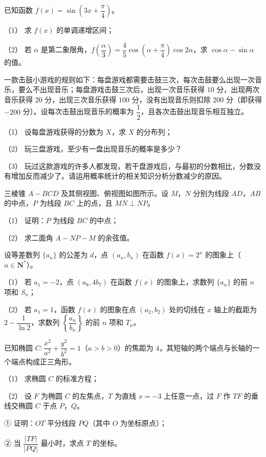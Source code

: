 \begin{question}
已知函数 $f(x)=\sin\left(3x+\dfrac\pi4\right)$。

（1） 求 $f(x)$ 的单调递增区间；

（2） 若 $\alpha$ 是第二象限角，$f\left(\dfrac\alpha3\right)=\dfrac45\cos\left(\alpha+\dfrac\pi4\right)\cos 2\alpha$，求 $\cos\alpha-\sin\alpha$ 的值。

\end{question}
\begin{question}
一款击鼓小游戏的规则如下：每盘游戏都需要击鼓三次，每次击鼓要么出现一次音乐，要么不出现音乐；每盘游戏击鼓三次后，出现一次音乐获得 $10$ 分，出现两次音乐获得 $20$ 分，出现三次音乐获得 $100$ 分，没有出现音乐则扣除 $200$ 分（即获得 $-200$ 分）。设每次击鼓出现音乐的概率为 $\dfrac12$，且各次击鼓出现音乐相互独立。

（1） 设每盘游戏获得的分数为 $X$，求 $X$ 的分布列；

（2） 玩三盘游戏，至少有一盘出现音乐的概率是多少？

（3） 玩过这款游戏的许多人都发现，若干盘游戏后，与最初的分数相比，分数没有增加反而减少了。请运用概率统计的相关知识分析分数减少的原因。

\Needspace{0.4\textheight}
\end{question}
\begin{question}
三棱锥 $A-BCD$ 及其侧视图、俯视图如图所示。设 $M$，$N$ 分别为线段 $AD$，$AB$ 的中点，$P$ 为线段 $BC$ 上的点，且 $MN\perp NP$。

（1） 证明：$P$ 为线段 $BC$ 的中点；

（2） 求二面角 $A-NP-M$ 的余弦值。
\nopagebreak[4]
\begin{center}\end{center}
\nopagebreak[4]
\end{question}
\begin{question}
设等差数列 $\{a_n\}$ 的公差为 $d$，点 $(a_n,b_n)$ 在函数 $f(x)=2^x$ 的图象上（$n\in\mathbf N^*$）。

（1） 若 $a_1=-2$，点 $(a_8,4b_7)$ 在函数 $f(x)$ 的图象上，求数列 $\{a_n\}$ 的前 $n$ 项和 $S_n$；

（2） 若 $a_1=1$，函数 $f(x)$ 的图象在点 $(a_2,b_2)$ 处的切线在 $x$ 轴上的截距为 $2-\dfrac1{\ln 2}$，求数列 $\left\{\dfrac{a_n}{b_n}\right\}$ 的前 $n$ 项和 $T_n$。

\end{question}
\begin{question}
已知椭圆 $C:\dfrac{x^2}{a^2}+\dfrac{y^2}{b^2}=1$（$a>b>0$）的焦距为 $4$，其短轴的两个端点与长轴的一个端点构成正三角形。

（1） 求椭圆 $C$ 的标准方程；

（2） 设 $F$ 为椭圆 $C$ 的左焦点，$T$ 为直线 $x=-3$ 上任意一点，过 $F$ 作 $TF$ 的垂线交椭圆 $C$ 于点 $P$，$Q$。

① 证明：$OT$ 平分线段 $PQ$（其中 $O$ 为坐标原点）；

② 当 $\dfrac{|TF|}{|PQ|}$ 最小时，求点 $T$ 的坐标。

\end{question}
